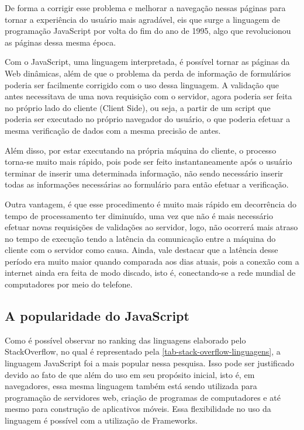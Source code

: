 De forma a corrigir esse problema e melhorar a navegação nessas páginas para tornar a experiência do usuário mais agradável, eis que surge a linguagem de programação JavaScript por volta do fim do ano de 1995, algo que revolucionou as páginas dessa mesma época.\cite{javascriptHistoria}

Com o JavaScript, uma linguagem interpretada, é possível tornar as páginas da Web dinâmicas, além de que o problema da perda de informação de formulários poderia ser facilmente corrigido com o uso dessa linguagem. A validação que antes necessitava de uma nova requisição com o servidor, agora poderia ser feita no próprio lado do cliente (Client Side), ou seja, a partir de um script que poderia ser executado no próprio navegador do usuário, o que poderia efetuar a mesma verificação de dados com a mesma precisão de antes.\cite{javascriptHistoria} \cite{javascriptWikipedia}

Além disso, por estar executando na própria máquina do cliente, o processo torna-se muito mais rápido, pois pode ser feito instantaneamente após o usuário terminar de inserir uma determinada informação, não sendo necessário inserir todas as informações necessárias ao formulário para então efetuar a verificação.\cite{formValidation}

Outra vantagem, é que esse procedimento é muito mais rápido em decorrência do tempo de processamento ter diminuído, uma vez que não é mais necessário efetuar novas requisições de validações ao servidor, logo, não ocorrerá mais atraso no tempo de execução tendo a latência da comunicação entre a máquina do cliente com o servidor como causa\cite{formValidation}. Ainda, vale destacar que a latência desse período era muito maior quando comparada aos dias atuais, pois a conexão com a internet ainda era feita de modo discado, isto é, conectando-se a rede mundial de computadores por meio do telefone.

\subsection{A popularidade do JavaScript}
\label{secao-javascript-popularidade}

Como é possível observar no ranking das linguagens elaborado pelo StackOverflow, no qual é representado pela \autoref{tab-stack-overflow-linguagens}, a linguagem JavaScript foi a mais popular nessa pesquisa. Isso pode ser justificado devido ao fato de que além do uso em seu propósito inicial, isto é, em navegadores, essa mesma linguagem também está sendo utilizada para programação de servidores web, criação de programas de computadores e até mesmo para construção de aplicativos móveis. Essa flexibilidade no uso da linguagem é possível com a utilização de Frameworks.

